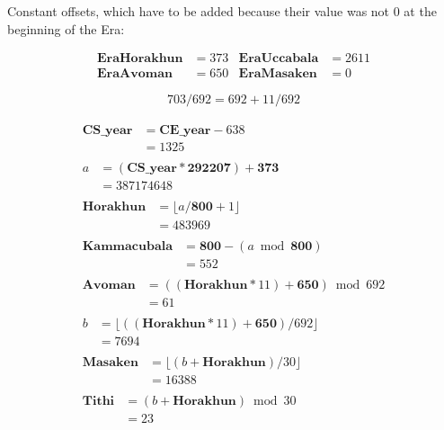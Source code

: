 \documentclass[11pt,oneside]{memoir-article}
\begin{document}
Constant offsets, which have to be added because their value was not 0 at the beginning of the Era:

\begin{align*}
  \mathbf{EraHorakhun} & = 373 & \mathbf{EraUccabala} & = 2611\\
  \mathbf{EraAvoman} & = 650 & \mathbf{EraMasaken} & = 0
\end{align*}

%
%

\begin{equation*}
703 / 692 = 692 + 11 / 692
\end{equation*}

\begin{align}
\begin{split}
   \mathbf{CS\_year} &= \mathbf{CE\_year} - 638\\
                     &= 1325
\end{split}\\
\begin{split}
                   a &= (\mathbf{CS\_year} * \mathbf{292207}) + \mathbf{373}\\
                     &= 387174648
\end{split}\\
\begin{split}
\mathbf{Horakhun}    &= \lfloor a / \mathbf{800} + 1 \rfloor\\
                     &= 483969
\end{split}\\
\begin{split}
\mathbf{Kammacubala} &= \mathbf{800} - (a \bmod \mathbf{800})\\
                     &= 552
\end{split}\\
\begin{split}
\mathbf{Avoman}      &= ((\mathbf{Horakhun} * 11) + \mathbf{650}) \bmod 692\\
                     &= 61
\end{split}\\
\begin{split}
                   b &= \lfloor ((\mathbf{Horakhun} * 11) + \mathbf{650}) / 692 \rfloor\\
                     &= 7694
\end{split}\\
\begin{split}
\mathbf{Masaken}     &= \lfloor (b + \mathbf{Horakhun}) / 30 \rfloor\\
                     &= 16388
\end{split}\\
\begin{split}
\mathbf{Tithi}       &= (b + \mathbf{Horakhun}) \bmod 30\\
                     &= 23
\end{split}
\end{align}
\end{document}
